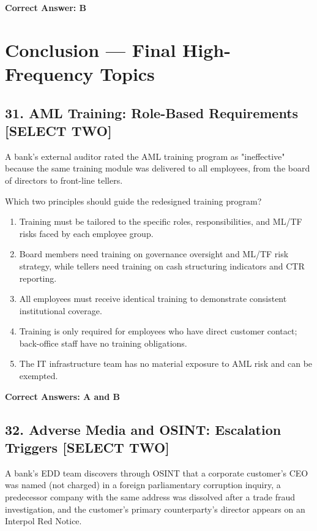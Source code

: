 \documentclass[11pt,a4paper]{article}
\begin{document}
	\textbf{Correct Answer: B}
	
	\section{Conclusion — Final High-Frequency Topics}
	
	\subsection{31. AML Training: Role-Based Requirements \textnormal{[SELECT TWO]}}
	
	A bank's external auditor rated the AML training program as "ineffective" because the same training module was delivered to all employees, from the board of directors to front-line tellers.
	
	Which two principles should guide the redesigned training program?
	
	\begin{enumerate}[label=\Alph*.]
		\item Training must be tailored to the specific roles, responsibilities, and ML/TF risks faced by each employee group.
		\item Board members need training on governance oversight and ML/TF risk strategy, while tellers need training on cash structuring indicators and CTR reporting.
		\item All employees must receive identical training to demonstrate consistent institutional coverage.
		\item Training is only required for employees who have direct customer contact; back-office staff have no training obligations.
		\item The IT infrastructure team has no material exposure to AML risk and can be exempted.
	\end{enumerate}
	
	\textbf{Correct Answers: A and B}
	
	\subsection{32. Adverse Media and OSINT: Escalation Triggers \textnormal{[SELECT TWO]}}
	
	A bank's EDD team discovers through OSINT that a corporate customer's CEO was named (not charged) in a foreign parliamentary corruption inquiry, a predecessor company with the same address was dissolved after a trade fraud investigation, and the customer's primary counterparty's director appears on an Interpol Red Notice.
	
\end{document}
